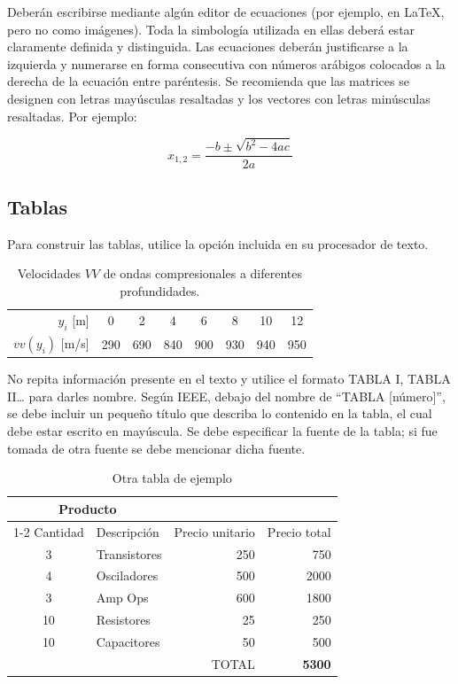 \documentclass{jornadas}
\begin{document}
Deberán escribirse mediante algún editor de ecuaciones (por ejemplo, en \LaTeX, pero no como imágenes). Toda la simbología utilizada en ellas deberá estar claramente definida y distinguida. Las ecuaciones deberán justificarse a la izquierda y numerarse en forma consecutiva con números arábigos colocados a la derecha de la ecuación entre paréntesis. Se recomienda que las matrices se designen con letras mayúsculas resaltadas y los vectores con letras minúsculas resaltadas. Por ejemplo:

\begin{equation}
    x_{1,2} = \frac{-b \pm \sqrt{b^2 - 4ac}}{2a}
\end{equation}

\subsection{Tablas}

Para construir las tablas, utilice la opción incluida en su procesador de texto. 

\begin{table}[H]
    \centering
    \caption{Velocidades $VV$ de ondas compresionales a diferentes profundidades.}
    \begin{tabular}{r|ccccccc}
    \toprule
        $y_i$ [m] & 0 & 2 & 4 & 6 & 8 & 10 & 12 \\
        $vv(y_i)$ [m/s] & 290 & 690 & 840 & 900 & 930 & 940 & 950 \\
    \bottomrule
    \end{tabular}
    \label{T:tabla}
\end{table}

No repita información presente en el texto y utilice el formato TABLA I, TABLA II… para darles nombre. Según IEEE, debajo del nombre de “TABLA [número]”, se debe incluir un pequeño título que describa lo contenido en la tabla, el cual debe estar escrito en mayúscula. Se debe especificar la fuente de la tabla; si fue tomada de otra fuente se debe mencionar dicha fuente.

\begin{table}[H]
\caption{Otra tabla de ejemplo}
\label{T:otratabla}
\centering
\begin{tabular}{c l r r}
\toprule
\multicolumn{2}{c}{Producto} \\
\cmidrule(r){1-2}
Cantidad & Descripción & Precio unitario & Precio total  \\
\midrule
3  & Transistores 	& 250	& 750	\\
4  & Osciladores   	& 500   & 2000 \\
3  & Amp Ops     	& 600   & 1800	\\
10 & Resistores  	& 25    & 250	\\
10 & Capacitores	& 50 	& 500	\\
\midrule 
\multicolumn{3}{r}{TOTAL} & \textbf{5300} \\
\bottomrule
\end{tabular}
\end{table}
\end{document}
